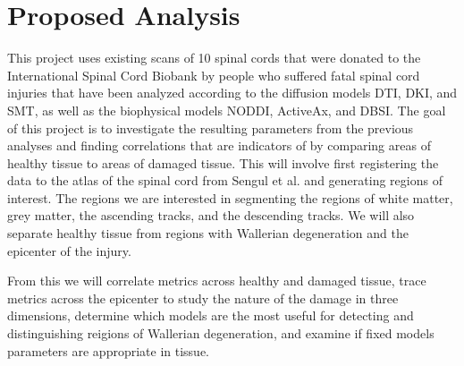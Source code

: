 \section{Proposed Analysis}
This project uses existing \dmri scans of 10 spinal cords that were donated to the International Spinal Cord Biobank by people who suffered fatal spinal cord injuries that have been analyzed according to the diffusion models DTI, DKI, and SMT, as well as the biophysical models NODDI, ActiveAx, and DBSI. The goal of this project is to investigate the resulting parameters from the previous analyses and finding correlations that are indicators of \sci by comparing areas of healthy tissue to areas of damaged tissue. This will involve first registering the \dmri data to the atlas of the spinal cord from Sengul et al. \cite{sengul2013atlas} and generating regions of interest. The regions we are interested in segmenting the regions of white matter, grey matter, the ascending tracks, and the descending tracks. We will also separate healthy tissue from regions with Wallerian degeneration and the epicenter of the injury.

From this we will correlate \dmri metrics across healthy and damaged tissue, trace metrics across the epicenter to study the nature of the damage in three dimensions, determine which models are the most useful for detecting and distinguishing reigions of Wallerian degeneration, and examine if fixed models parameters are appropriate in \sci tissue.